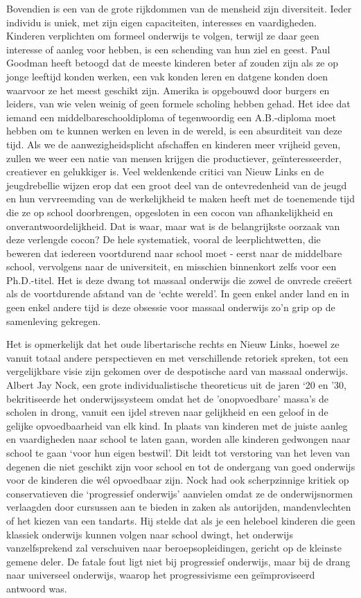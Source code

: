 \documentclass[
  a5paper,
  smalldemyvopaper,10pt,twoside,onecolumn,openright,extrafontsizes,hidelinks]{memoir}
\begin{document}
Bovendien is een van de grote rijkdommen van de mensheid zijn
diversiteit. Ieder individu is uniek, met zijn eigen capaciteiten,
interesses en vaardigheden. Kinderen verplichten om formeel onderwijs te
volgen, terwijl ze daar geen interesse of aanleg voor hebben, is een
schending van hun ziel en geest. Paul Goodman heeft betoogd dat de
meeste kinderen beter af zouden zijn als ze op jonge leeftijd konden
werken, een vak konden leren en datgene konden doen waarvoor ze het
meest geschikt zijn. Amerika is opgebouwd door burgers en leiders, van
wie velen weinig of geen formele scholing hebben gehad. Het idee dat
iemand een middelbareschooldiploma of tegenwoordig een A.B.-diploma moet
hebben om te kunnen werken en leven in de wereld, is een absurditeit van
deze tijd. Als we de aanwezigheidsplicht afschaffen en kinderen meer
vrijheid geven, zullen we weer een natie van mensen krijgen die
productiever, geïnteresseerder, creatiever en gelukkiger is. Veel
weldenkende critici van Nieuw Links en de jeugdrebellie wijzen erop dat
een groot deel van de ontevredenheid van de jeugd en hun vervreemding
van de werkelijkheid te maken heeft met de toenemende tijd die ze op
school doorbrengen, opgesloten in een cocon van afhankelijkheid en
onverantwoordelijkheid. Dat is waar, maar wat is de belangrijkste
oorzaak van deze verlengde cocon? De hele systematiek, vooral de
leerplichtwetten, die beweren dat iedereen voortdurend naar school moet
- eerst naar de middelbare school, vervolgens naar de universiteit, en
misschien binnenkort zelfs voor een Ph.D.-titel. Het is deze dwang tot
massaal onderwijs die zowel de onvrede creëert als de voortdurende
afstand van de `echte wereld'. In geen enkel ander land en in geen enkel
andere tijd is deze obsessie voor massaal onderwijs zo'n grip op de
samenleving gekregen.

Het is opmerkelijk dat het oude libertarische rechts en Nieuw Links,
hoewel ze vanuit totaal andere perspectieven en met verschillende
retoriek spreken, tot een vergelijkbare visie zijn gekomen over de
despotische aard van massaal onderwijs. Albert Jay Nock, een grote
individualistische theoreticus uit de jaren `20 en '30, bekritiseerde
het onderwijssysteem omdat het de 'onopvoedbare' massa's de scholen in
drong, vanuit een ijdel streven naar gelijkheid en een geloof in de
gelijke opvoedbaarheid van elk kind. In plaats van kinderen met de
juiste aanleg en vaardigheden naar school te laten gaan, worden alle
kinderen gedwongen naar school te gaan `voor hun eigen bestwil'. Dit
leidt tot verstoring van het leven van degenen die niet geschikt zijn
voor school en tot de ondergang van goed onderwijs voor de kinderen die
wél opvoedbaar zijn. Nock had ook scherpzinnige kritiek op
conservatieven die `progressief onderwijs' aanvielen omdat ze de
onderwijsnormen verlaagden door cursussen aan te bieden in zaken als
autorijden, mandenvlechten of het kiezen van een tandarts. Hij stelde
dat als je een heleboel kinderen die geen klassiek onderwijs kunnen
volgen naar school dwingt, het onderwijs vanzelfsprekend zal verschuiven
naar beroepsopleidingen, gericht op de kleinste gemene deler. De fatale
fout ligt niet bij progressief onderwijs, maar bij de drang naar
universeel onderwijs, waarop het progressivisme een geïmproviseerd
antwoord was.
\end{document}
